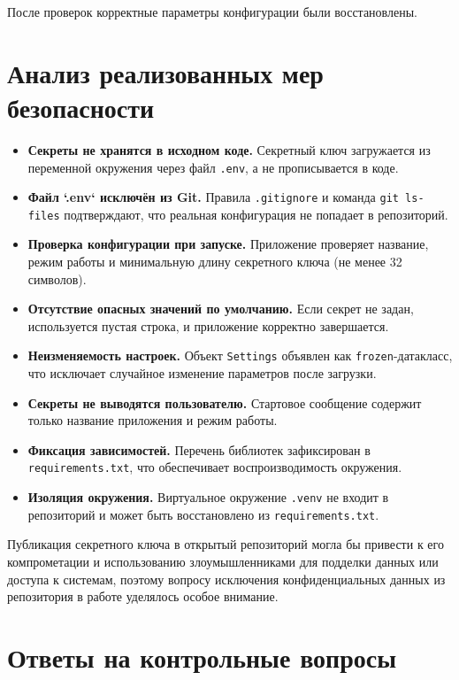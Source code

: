\documentclass[12pt,a4paper]{article}
\begin{document}
После проверок корректные параметры конфигурации были восстановлены.

\section{Анализ реализованных мер безопасности}

\begin{itemize}
\item \textbf{Секреты не хранятся в исходном коде.} Секретный ключ загружается из переменной окружения через файл \texttt{.\allowbreak{}env}, а не прописывается в коде.
\item \textbf{Файл `.env` исключён из Git.} Правила \texttt{.\allowbreak{}gitignore} и команда \texttt{git ls-files} подтверждают, что реальная конфигурация не попадает в репозиторий.
\item \textbf{Проверка конфигурации при запуске.} Приложение проверяет название, режим работы и минимальную длину секретного ключа (не менее 32 символов).
\item \textbf{Отсутствие опасных значений по умолчанию.} Если секрет не задан, используется пустая строка, и приложение корректно завершается.
\item \textbf{Неизменяемость настроек.} Объект \texttt{Settings} объявлен как \texttt{frozen}-датакласс, что исключает случайное изменение параметров после загрузки.
\item \textbf{Секреты не выводятся пользователю.} Стартовое сообщение содержит только название приложения и режим работы.
\item \textbf{Фиксация зависимостей.} Перечень библиотек зафиксирован в \texttt{requirements.\allowbreak{}txt}, что обеспечивает воспроизводимость окружения.
\item \textbf{Изоляция окружения.} Виртуальное окружение \texttt{.\allowbreak{}venv} не входит в репозиторий и может быть восстановлено из \texttt{requirements.\allowbreak{}txt}.
\end{itemize}
Публикация секретного ключа в открытый репозиторий могла бы привести к его компрометации и использованию злоумышленниками для подделки данных или доступа к системам, поэтому вопросу исключения конфиденциальных данных из репозитория в работе уделялось особое внимание.

\section{Ответы на контрольные вопросы}
\end{document}
